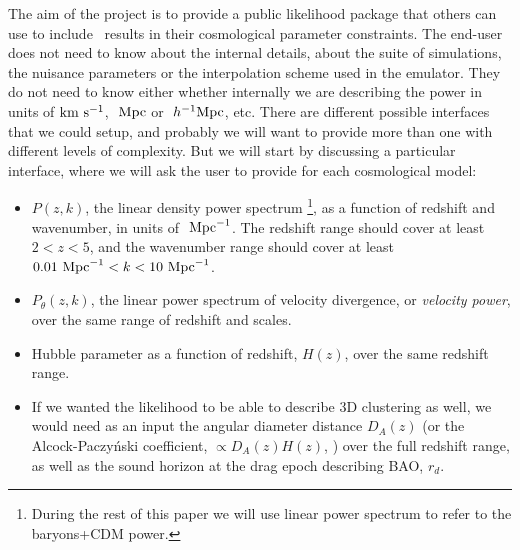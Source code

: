 The aim of the project is to provide a public likelihood package that others
can use to include \lya\ results in their cosmological parameter constraints.
The end-user does not need to know about the internal details, about the
suite of simulations, the nuisance parameters or the interpolation scheme
used in the emulator.
They do not need to know either whether internally we are describing the
power in units of ${\rm km~s^{-1}}$, $\ \text{Mpc}$ or $\ h^{-1}\text{Mpc}$, etc.
There are different possible interfaces that we could setup, and probably
we will want to provide more than one with different levels of complexity.
But we will start by discussing a particular interface, where we will ask
the user to provide for each cosmological model:
\begin{itemize}
 \item $P(z,k)$, the linear density power spectrum
  \footnote{During the rest of this paper we will use linear power spectrum
  to refer to the baryons+CDM power.}, as a function of redshift and
  wavenumber, in units of $\ \text{Mpc}^{-1}$.
  The redshift range should cover at least $2 < z < 5$, and the wavenumber
  range should cover at least $0.01 \ \text{Mpc}^{-1} < k < 10 \ \text{Mpc}^{-1}$.
 \item $P_\theta(z,k)$, the linear power spectrum of velocity divergence,
  or \textit{velocity power}, over the same range of redshift and scales.
 \item Hubble parameter as a function of redshift, $H(z)$, over the same
  redshift range.
 \item If we wanted the likelihood to be able to describe 3D clustering as well,
  we would need as an input the angular diameter distance $D_A(z)$ (or the
  Alcock-Paczy\'nski coefficient, $\propto D_A(z) H(z)$, \cite{Alcock1979})
  over the full redshift range, as well as the sound horizon at the drag epoch
  describing BAO, $r_d$. 
\end{itemize}

